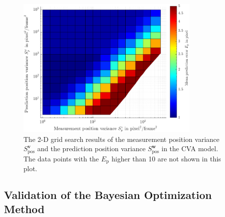 \begin{figure}[htbp]
\centering
\includegraphics[width=0.8\textwidth]{figures/KF/2d cva1.png}
\caption{The 2-D grid search results of the measurement position variance $S_{\mathrm{pos}}^{\boldsymbol{v}}$ and the prediction position variance $S_{\mathrm{pos}}^{\boldsymbol{w}}$ in the CVA model. The data points with the $E_{\mathrm{p}}$ higher than 10 are not shown in this plot.}
\label{2d cva}
\end{figure}







\subsection{Validation of the Bayesian Optimization Method}
\label{validation}

